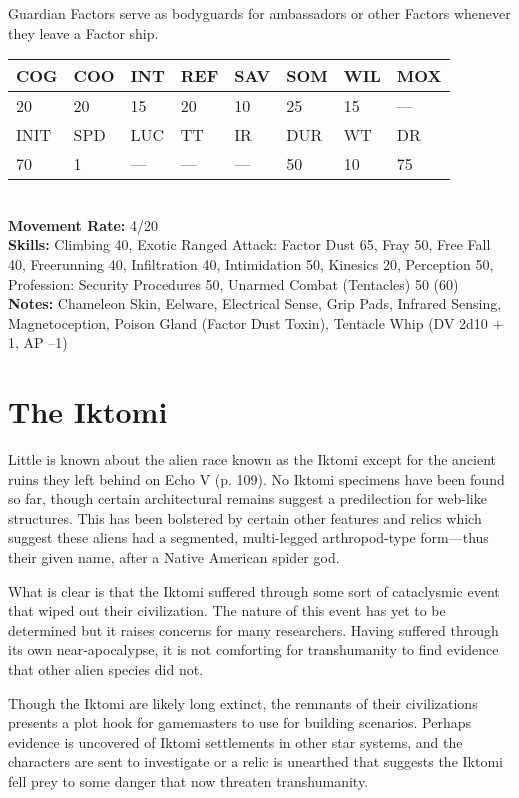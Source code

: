 Guardian Factors serve as bodyguards for ambassadors or other Factors whenever they leave a Factor ship. \\ \begin{tabular}{|l|l|l|l|l|l|l|l|} \hline

COG &COO &INT &REF &SAV &SOM &WIL &MOX \\ \hline

20 &20 &15 &20 &10 &25 &15 &— \\ \hline

INIT &SPD &LUC &TT &IR &DUR &WT &DR \\ \hline

70 &1 &— &— &— &50 &10 &75 \\ \hline

\end{tabular} \\ \textbf{Movement Rate: }4/20 \\ \textbf{Skills:} Climbing 40, Exotic Ranged Attack: Factor Dust 65, Fray 50, Free Fall 40, Freerunning 40, Infiltration 40, Intimidation 50, Kinesics 20, Perception 50, Profession: Security Procedures 50, Unarmed Combat (Tentacles) 50 (60) \\ \textbf{Notes:} Chameleon Skin, Eelware, Electrical Sense, Grip Pads, Infrared Sensing, Magnetoception, Poison Gland (Factor Dust Toxin), Tentacle Whip (DV 2d10 + 1, AP –1) 



\section{The Iktomi} 

Little is known about the alien race known as the Iktomi except for the ancient ruins they left behind on Echo V (p. 109). No Iktomi specimens have been found so far, though certain architectural remains suggest a predilection for web-like structures. This has been bolstered by certain other features and relics which suggest these aliens had a segmented, multi-legged arthropod-type form—thus their given name, after a Native American spider god. 

What is clear is that the Iktomi suffered through some sort of cataclysmic event that wiped out their civilization. The nature of this event has yet to be determined but it raises concerns for many researchers. Having suffered through its own near-apocalypse, it is not comforting for transhumanity to find evidence that other alien species did not. 

Though the Iktomi are likely long extinct, the remnants of their civilizations presents a plot hook for gamemasters to use for building scenarios. Perhaps evidence is uncovered of Iktomi settlements in other star systems, and the characters are sent to investigate or a relic is unearthed that suggests the Iktomi fell prey to some danger that now threaten transhumanity. 

